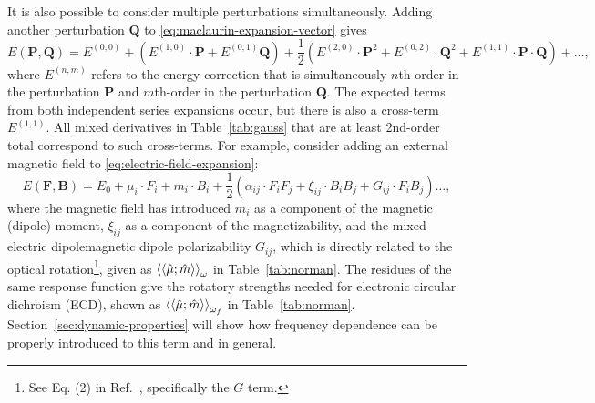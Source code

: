 \documentclass[%
class = book,%
crop = false,%
float = true,%
multi = true,%
preview = false,%
]{standalone}
\begin{document}
It is also possible to consider multiple perturbations simultaneously. Adding another perturbation \(\mathbf{Q}\) to \eqref{eq:maclaurin-expansion-vector} gives
\begin{equation}
  \label{eq:two-perturbation-expansion}
  E(\mathbf{P}, \mathbf{Q}) = E^{(0,0)} + \left(E^{(1,0)} \cdot \mathbf{P} + E^{(0,1)} \mathbf{Q}\right) + \frac{1}{2} \left(E^{(2,0)} \cdot \mathbf{P}^{2} + E^{(0,2)} \cdot \mathbf{Q}^{2} + E^{(1,1)} \cdot \mathbf{P} \cdot \mathbf{Q}\right) + \dots,
\end{equation}
where \(E^{(n,m)}\) refers to the energy correction that is simultaneously \(n\)th-order in the perturbation \(\mathbf{P}\) and \(m\)th-order in the perturbation \(\mathbf{Q}\). The expected terms from both independent series expansions occur, but there is also a cross-term \(E^{(1,1)}\). All mixed derivatives in Table~\ref{tab:gauss} that are at least 2nd-order total correspond to such cross-terms. For example, consider adding an external magnetic field to \eqref{eq:electric-field-expansion}:
\begin{equation}
  \label{eq:electric-and-magnetic-field-expansion}
  E(\mathbf{F}, \mathbf{B}) = E_{0} + \mu_{i} \cdot F_{i} + m_{i} \cdot B_{i} + \frac{1}{2} \left( \alpha_{ij} \cdot F_{i}F_{j} + \xi_{ij} \cdot B_{i}B_{j} + G_{ij} \cdot F_{i}B_{j} \right) \dots,
\end{equation}
where the magnetic field has introduced \(m_{i}\) as a component of the magnetic (dipole) moment, \(\xi_{ij}\) as a component of the magnetizability, and the mixed electric dipole\textendash{}magnetic dipole polarizability \(G_{ij}\), which is directly related to the optical rotation\footnote{See Eq. (2) in Ref.~\parencite{WCMS:WCMS55}, specifically the \(G\) term.}, given as \(\braket{\braket{\hat{\mu};\hat{m}}}_{\omega}\) in Table~\ref{tab:norman}. The residues of the same response function give the rotatory strengths needed for electronic circular dichroism (ECD), shown as \(\braket{\braket{\hat{\mu};\hat{m}}}_{\omega_{f}}\) in Table~\ref{tab:norman}. Section~\ref{sec:dynamic-properties} will show how frequency dependence can be properly introduced to this term and in general.

\end{document}
